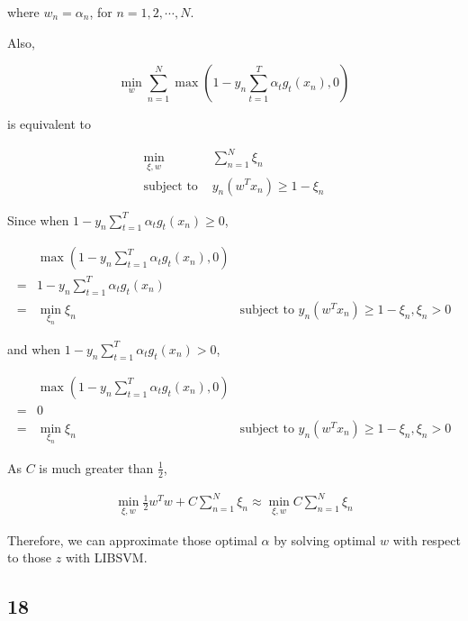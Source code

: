 \documentclass[fleqn,a4paper,12pt]{article}
\begin{document}
where $w_n = \alpha_n$, for $n = 1, 2, \cdots, N$.

Also,

$$\min_{w} \sum_{n=1}^N \max(1 - y_n \sum_{t=1}^T \alpha_t g_t(x_n), 0)$$

is equivalent to

\begin{align*}
  \min_{\xi, w} & \sum_{n=1}^N  \xi_n   \\
  \text{subject to } & y_n (w^T x_n) \geq 1 - \xi_n
\end{align*}

Since when $1 - y_n \sum_{t=1}^T \alpha_t g_t(x_n) \geq 0$,

\begin{align*}
  &  \max(1 - y_n \sum_{t=1}^T \alpha_t g_t(x_n), 0) \\
  =& 1 - y_n \sum_{t=1}^T \alpha_t g_t(x_n) \\
  =& \min_{\xi_n} \xi_n  & \text{subject to } y_n (w^T x_n) \geq 1 - \xi_n, \xi_n > 0
\end{align*}

and when $1 - y_n \sum_{t=1}^T \alpha_t g_t(x_n) > 0$,

\begin{align*}
  &  \max(1 - y_n \sum_{t=1}^T \alpha_t g_t(x_n), 0) \\
  =& 0 \\
  =& \min_{\xi_n} \xi_n  & \text{subject to } y_n (w^T x_n) \geq 1 - \xi_n, \xi_n > 0
\end{align*}

As $C$ is much greater than $\frac{1}{2}$,

\begin{align*}
  \min_{\xi, w} \frac{1}{2} w^T w +  C \sum_{n=1}^N  \xi_n \approx \min_{\xi, w} C \sum_{n=1}^N  \xi_n  
\end{align*}

Therefore, we can approximate those optimal $\alpha$ by solving optimal $w$ with respect to those $z$ with LIBSVM.

\subsection*{18}
\end{document}
